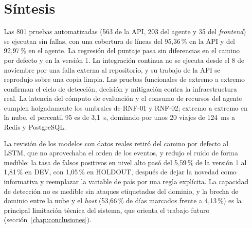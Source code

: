 \section{Síntesis}
\label{sec:sintesis-pruebas}
Las 801 pruebas automatizadas (563 de la API, 203 del agente y 35 del \emph{frontend}) se ejecutan sin fallas, con una cobertura de líneas del 95,36\,\% en la API y del 92,97\,\% en el agente. La regresión del puntaje pasa sin diferencias en el camino por defecto y en la versión 1. La integración continua no se ejecuta desde el 8 de noviembre por una falla externa al repositorio, y su trabajo de la API se reprodujo sobre una copia limpia. Las pruebas funcionales de extremo a extremo confirman el ciclo de detección, decisión y mitigación contra la infraestructura real. La latencia del cómputo de evaluación y el consumo de recursos del agente cumplen holgadamente los umbrales de RNF-01 y RNF-02; extremo a extremo en la nube, el percentil 95 es de 3,1~s, dominado por unos 20 viajes de 124~ms a Redis y PostgreSQL. 

La revisión de los modelos con datos reales retiró del camino por defecto al LSTM, que no aprovechaba el orden de los eventos, y redujo el ruido de forma medible: la tasa de falsos positivos en nivel alto pasó del 5,59\,\% de la versión 1 al 1,81\,\% en DEV, con 1,05\,\% en HOLDOUT, después de dejar la novedad como informativa y reemplazar la variable de país por una regla explícita. La capacidad de detección no es medible sin ataques etiquetados del dominio, y la brecha de dominio entre la nube y el \emph{host} (53,66\,\% de días marcados frente a 4,13\,\%) es la principal limitación técnica del sistema, que orienta el trabajo futuro (sección~\ref{chap:conclusiones}).
